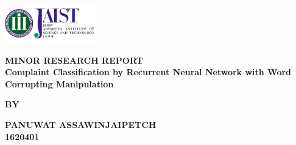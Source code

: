 \begin{titlepage}
    \begin{center}
        
        \includegraphics[width=0.3\textwidth]{image/jaist.png}
        \vspace*{1cm}
        
        \large
        \textbf{MINOR RESEARCH REPORT}\\
        \textbf{Complaint Classification by Recurrent Neural Network with Word Corrupting Manipulation}
        
        \vspace{2cm}
        
        \textbf{BY}
        
        \vspace{1.5cm}
        
        \textbf{PANUWAT ASSAWINJAIPETCH}\\
        \textbf{1620401}\\
        
        \vfill
        
        

        
    \end{center}
\end{titlepage}
